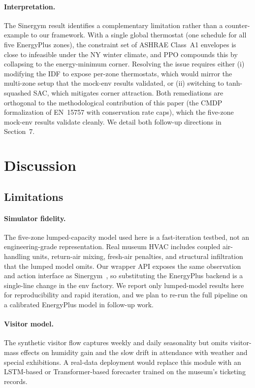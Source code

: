 \documentclass[11pt,a4paper]{article}
\begin{document}
\paragraph{Interpretation.}
The Sinergym result identifies a complementary limitation rather than
a counter-example to our framework. With a single global thermostat
(one schedule for all five EnergyPlus zones), the constraint set of
ASHRAE Class~A1 envelopes is close to infeasible under the NY winter
climate, and PPO compounds this by collapsing to the energy-minimum
corner. Resolving the issue requires either (i) modifying the IDF to
expose per-zone thermostats, which would mirror the multi-zone setup
that the mock-env results validated, or (ii) switching to
tanh-squashed SAC, which mitigates corner attraction. Both
remediations are orthogonal to the methodological contribution of this
paper (the CMDP formalization of EN~15757 with conservation rate
caps), which the five-zone mock-env results validate cleanly. We
detail both follow-up directions in Section~7.

\section{Discussion}\label{sec:discussion}

\subsection{Limitations}

\paragraph{Simulator fidelity.}
The five-zone lumped-capacity model used here is a fast-iteration
testbed, not an engineering-grade representation. Real museum HVAC
includes coupled air-handling units, return-air mixing, fresh-air
penalties, and structural infiltration that the lumped model omits.
Our wrapper API exposes the same observation and action interface as
Sinergym~\citep{manjavacas2024sinergym}, so substituting the
EnergyPlus backend is a single-line change in the env factory. We
report only lumped-model results here for reproducibility and rapid
iteration, and we plan to re-run the full pipeline on a calibrated
EnergyPlus model in follow-up work.

\paragraph{Visitor model.}
The synthetic visitor flow captures weekly and daily seasonality but
omits visitor-mass effects on humidity gain and the slow drift in
attendance with weather and special exhibitions. A real-data
deployment would replace this module with an LSTM-based or
Transformer-based forecaster trained on the museum's ticketing
records.
\end{document}
